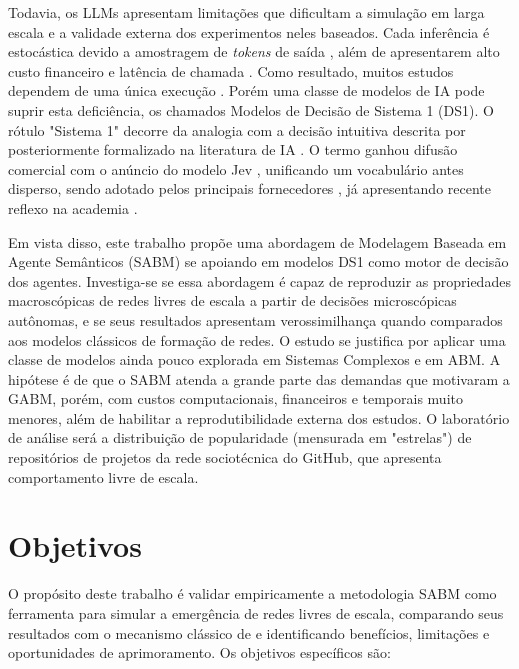 \documentclass[12pt,oneside,a4paper,brazil,sumario=tradicional]{abntex2}
\begin{document}
Todavia, os LLMs apresentam limitações que dificultam a simulação em larga escala e a validade externa dos experimentos neles baseados. Cada inferência é estocástica devido a amostragem de \textit{tokens} de saída \parencite{zhao2023,minaee2024}, além de apresentarem alto custo financeiro e latência de chamada \parencite{chopra2024,taillandier2026}. Como resultado, muitos estudos dependem de uma única execução \parencite{larooij2025}. Porém uma classe de modelos de IA pode suprir esta deficiência, os chamados Modelos de Decisão de Sistema 1 (DS1). O rótulo "Sistema 1" decorre da analogia com a decisão intuitiva descrita por \textcite{kahneman2003} posteriormente formalizado na literatura de IA \parencite{bengio2019, booch2021, goyal2022}. O termo ganhou difusão comercial com o anúncio do modelo Jev \parencite{typesafe2026}, unificando um vocabulário antes disperso, sendo adotado pelos principais fornecedores \parencite{microsoft2026, cloudflare2026, openai2026}, já apresentando recente reflexo na academia \parencite{santos2026,du2026reliable,azizi2026labelsoverridedefinitionsjevstyle}.

Em vista disso, este trabalho propõe uma abordagem de Modelagem Baseada em Agente Semânticos (SABM) se apoiando em modelos DS1 como motor de decisão dos agentes.  Investiga-se se essa abordagem é capaz de reproduzir as propriedades macroscópicas de redes livres de escala a partir de decisões microscópicas autônomas, e se seus resultados apresentam verossimilhança quando comparados aos modelos clássicos de formação de redes. O estudo se justifica por aplicar uma classe de modelos ainda pouco explorada em Sistemas Complexos e em ABM. A hipótese é de que o SABM atenda a grande parte das demandas que motivaram a GABM, porém, com custos computacionais, financeiros e temporais muito menores, além de habilitar a reprodutibilidade externa dos estudos. O laboratório de análise será a distribuição de popularidade (mensurada em "estrelas") de repositórios de projetos da rede sociotécnica do GitHub, que apresenta comportamento livre de escala.

\section{Objetivos}

O propósito deste trabalho é validar empiricamente a metodologia SABM como ferramenta para simular a emergência de redes livres de escala, comparando seus resultados com o mecanismo clássico de \textcite{barabasi1999} e identificando benefícios, limitações e oportunidades de aprimoramento. Os objetivos específicos são:
\end{document}
